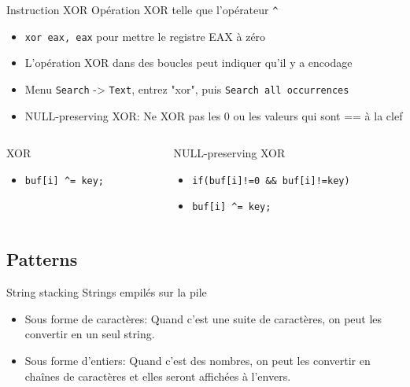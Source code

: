 \documentclass[10pt,xcolor={table,dvipsnames},t]{beamer}
\begin{document}
\begin{frame}{Instruction XOR}
    Opération XOR telle que l'opérateur \texttt{\textasciicircum}
    \begin{itemize}
        \item \texttt{xor eax, eax} pour mettre le registre EAX à zéro
        \item L'opération XOR dans des boucles peut indiquer qu'il y a encodage
        \item Menu \texttt{Search} -> \texttt{Text}, entrez "xor", puis \texttt{Search all occurrences}
        \item NULL-preserving XOR: Ne XOR pas les 0 ou les valeurs qui sont == à la clef
    \end{itemize}
    
        \begin{columns}[T]
    
        \begin{column}{0.48\textwidth}
        XOR
        \begin{itemize}
            \item \texttt{buf[i] \textasciicircum= key;}
        \end{itemize}
        \end{column}
        
        \begin{column}{0.48\textwidth}
        NULL-preserving XOR
        \begin{itemize}
            \item \texttt{if(buf[i]!=0 \&\& buf[i]!=key)}
            \item \texttt{\quad buf[i] \textasciicircum= key;}
        \end{itemize}
        \end{column}
    
    \end{columns}
    
\end{frame}

\subsection{Patterns}

\begin{frame}{String stacking}
    Strings empilés sur la pile
    \begin{itemize}
        \item Sous forme de caractères: Quand c'est une suite de caractères, on peut les convertir en un seul string. 
        \item Sous forme d'entiers: Quand c'est des nombres, on peut les convertir en chaînes de caractères et elles seront affichées à l'envers.
    \end{itemize}

\end{frame}
\end{document}
